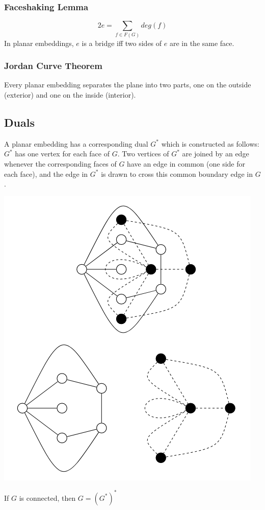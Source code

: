 \documentclass[11pt]{article}
\begin{document}
\subsubsection{Faceshaking Lemma}
$$2e = \sum_{f \in F(G)} deg(f)$$
In planar embeddings, $e$ is a bridge iff two sides of $e$ are in the same face. 
\subsubsection{Jordan Curve Theorem}
Every planar embedding separates the plane into two parts, one on the outside (exterior) and one on the inside (interior). 

\subsection{Duals}
A planar embedding has a corresponding dual $G^*$ which is constructed as follows: $G^*$ has one vertex for each face of $G$. Two vertices of $G^*$ are joined by an edge whenever the corresponding faces of $G$ have an edge in common (one side for each face), and the edge in $G^*$ is drawn to cross this common boundary edge in $G$. 
\begin{center}
    \includegraphics[scale=0.70]{Figures/Dual.png}
\end{center}
If $G$ is connected, then $G = (G^*)^*$ 
\end{document}
